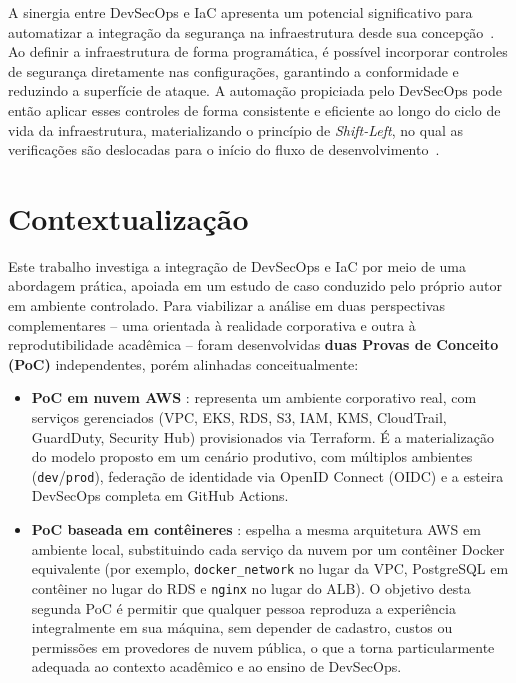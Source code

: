 A sinergia entre DevSecOps e IaC apresenta um potencial significativo para automatizar a integração da segurança na infraestrutura desde sua concepção~. Ao definir a infraestrutura de forma programática, é possível incorporar controles de segurança diretamente nas configurações, garantindo a conformidade e reduzindo a superfície de ataque. A automação propiciada pelo DevSecOps pode então aplicar esses controles de forma consistente e eficiente ao longo do ciclo de vida da infraestrutura, materializando o princípio de \textit{Shift-Left}, no qual as verificações são deslocadas para o início do fluxo de desenvolvimento~.

\section{Contextualização}
\label{sec:contextualizacao}

Este trabalho investiga a integração de DevSecOps e IaC por meio de uma abordagem prática, apoiada em um estudo de caso conduzido pelo próprio autor em ambiente controlado. Para viabilizar a análise em duas perspectivas complementares -- uma orientada à realidade corporativa e outra à reprodutibilidade acadêmica -- foram desenvolvidas \textbf{duas Provas de Conceito (PoC)} independentes, porém alinhadas conceitualmente:

\begin{itemize}
    \item \textbf{PoC em nuvem AWS} : representa um ambiente corporativo real, com serviços gerenciados (VPC, EKS, RDS, S3, IAM, KMS, CloudTrail, GuardDuty, Security Hub) provisionados via Terraform. É a materialização do modelo proposto em um cenário produtivo, com múltiplos ambientes (\texttt{dev}/\texttt{prod}), federação de identidade via OpenID Connect (OIDC) e a esteira DevSecOps completa em GitHub Actions.

    \item \textbf{PoC baseada em contêineres} : espelha a mesma arquitetura AWS em ambiente local, substituindo cada serviço da nuvem por um contêiner Docker equivalente (por exemplo, \texttt{docker\_network} no lugar da VPC, PostgreSQL em contêiner no lugar do RDS e \texttt{nginx} no lugar do ALB). O objetivo desta segunda PoC é permitir que qualquer pessoa reproduza a experiência integralmente em sua máquina, sem depender de cadastro, custos ou permissões em provedores de nuvem pública, o que a torna particularmente adequada ao contexto acadêmico e ao ensino de DevSecOps.
\end{itemize}

